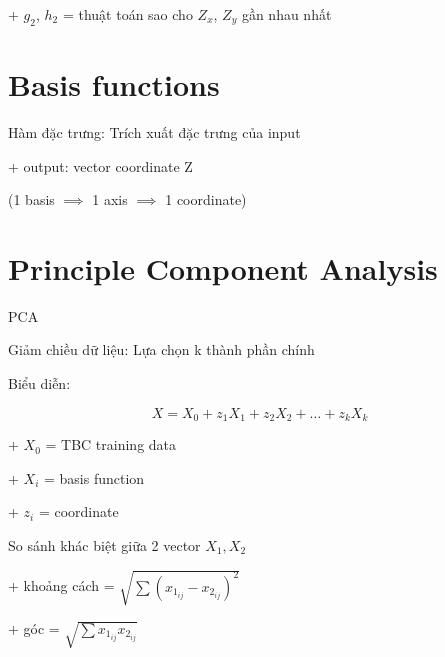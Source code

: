 \documentclass{article}
\begin{document}
+ $g_2$, $h_2$ = thuật toán sao cho $Z_x$, $Z_y$ gần nhau nhất

\section{Basis functions}

Hàm đặc trưng: Trích xuất đặc trưng của input

+ output: vector coordinate Z 

(1 basis $\implies$ 1 axis $\implies$ 1 coordinate)

\section{Principle Component Analysis}

PCA

Giảm chiều dữ liệu: Lựa chọn k thành phần chính

Biểu diễn:

$$X = X_0 + z_1 X_1 + z_2 X_2 + \dots + z_k X_k$$


+ $X_0$ = TBC \space training \space data

+ $X_i$ = basis function

+ $z_i$ = coordinate

So sánh khác biệt giữa 2 vector $X_1, X_2$

+ khoảng cách = $\sqrt{\sum (x_{1_{ij}} - x_{2_{ij}})^2}$

+ góc = $\sqrt{\sum x_{1_{ij}} x_{2_{ij}}}$
\end{document}

